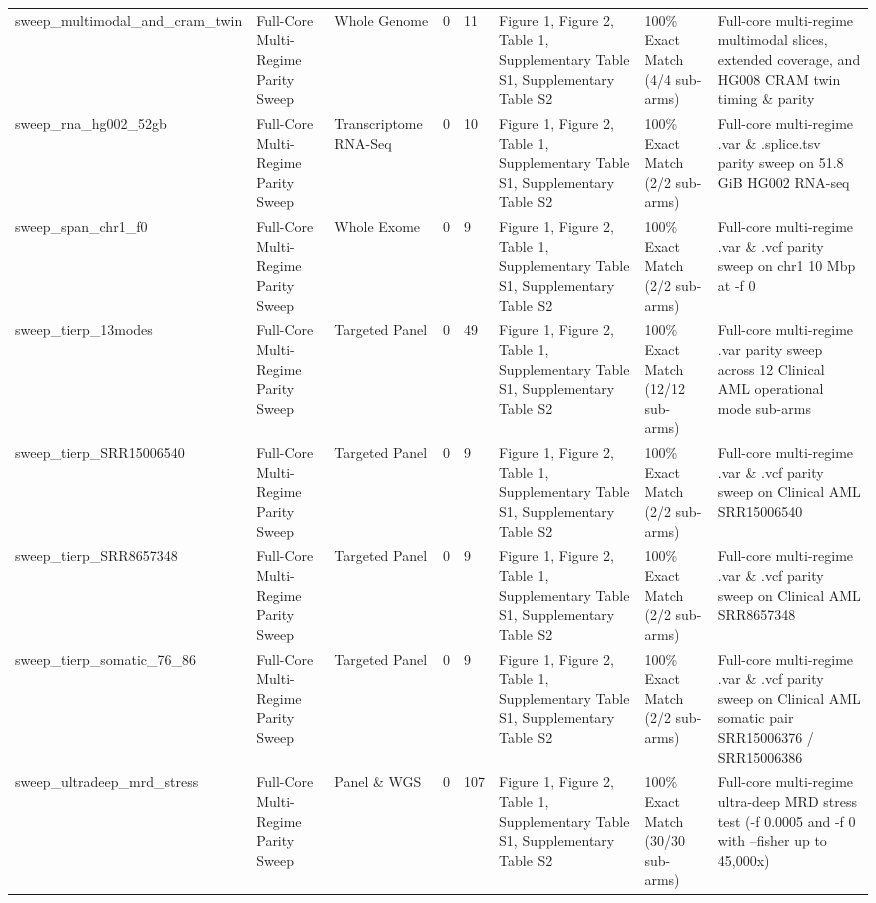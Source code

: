 \begin{table}[htbp]
{\begin{tabular}{llllllll}
sweep\_multimodal\_and\_cram\_twin & Full-Core Multi-Regime Parity Sweep & Whole Genome & 0 & 11 & Figure 1, Figure 2, Table 1, Supplementary Table S1, Supplementary Table S2 & 100\% Exact Match (4/4 sub-arms) & Full-core multi-regime multimodal slices, extended coverage, and HG008 CRAM twin timing \& parity \\
sweep\_rna\_hg002\_52gb & Full-Core Multi-Regime Parity Sweep & Transcriptome RNA-Seq & 0 & 10 & Figure 1, Figure 2, Table 1, Supplementary Table S1, Supplementary Table S2 & 100\% Exact Match (2/2 sub-arms) & Full-core multi-regime .var \& .splice.tsv parity sweep on 51.8 GiB HG002 RNA-seq \\
sweep\_span\_chr1\_f0 & Full-Core Multi-Regime Parity Sweep & Whole Exome & 0 & 9 & Figure 1, Figure 2, Table 1, Supplementary Table S1, Supplementary Table S2 & 100\% Exact Match (2/2 sub-arms) & Full-core multi-regime .var \& .vcf parity sweep on chr1 10 Mbp at -f 0 \\
sweep\_tierp\_13modes & Full-Core Multi-Regime Parity Sweep & Targeted Panel & 0 & 49 & Figure 1, Figure 2, Table 1, Supplementary Table S1, Supplementary Table S2 & 100\% Exact Match (12/12 sub-arms) & Full-core multi-regime .var parity sweep across 12 Clinical AML operational mode sub-arms \\
sweep\_tierp\_SRR15006540 & Full-Core Multi-Regime Parity Sweep & Targeted Panel & 0 & 9 & Figure 1, Figure 2, Table 1, Supplementary Table S1, Supplementary Table S2 & 100\% Exact Match (2/2 sub-arms) & Full-core multi-regime .var \& .vcf parity sweep on Clinical AML SRR15006540 \\
sweep\_tierp\_SRR8657348 & Full-Core Multi-Regime Parity Sweep & Targeted Panel & 0 & 9 & Figure 1, Figure 2, Table 1, Supplementary Table S1, Supplementary Table S2 & 100\% Exact Match (2/2 sub-arms) & Full-core multi-regime .var \& .vcf parity sweep on Clinical AML SRR8657348 \\
sweep\_tierp\_somatic\_76\_86 & Full-Core Multi-Regime Parity Sweep & Targeted Panel & 0 & 9 & Figure 1, Figure 2, Table 1, Supplementary Table S1, Supplementary Table S2 & 100\% Exact Match (2/2 sub-arms) & Full-core multi-regime .var \& .vcf parity sweep on Clinical AML somatic pair SRR15006376 / SRR15006386 \\
sweep\_ultradeep\_mrd\_stress & Full-Core Multi-Regime Parity Sweep & Panel \& WGS & 0 & 107 & Figure 1, Figure 2, Table 1, Supplementary Table S1, Supplementary Table S2 & 100\% Exact Match (30/30 sub-arms) & Full-core multi-regime ultra-deep MRD stress test (-f 0.0005 and -f 0 with --fisher up to 45,000x) \\

\end{tabular}}
\end{table}
